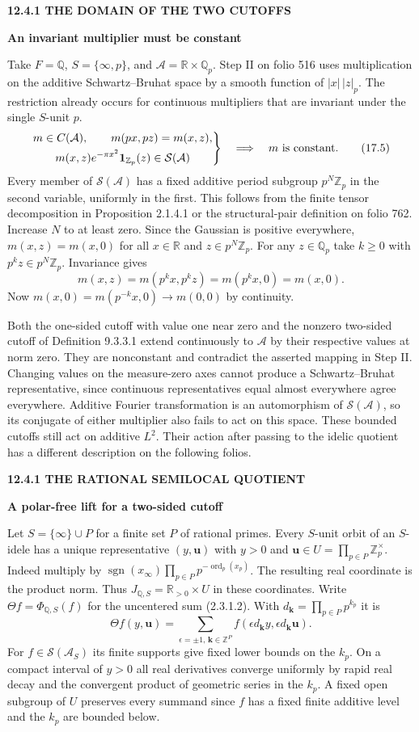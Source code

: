\documentclass[11pt,letterpaper]{article}
\newcommand{\rightmarktext}{}
\newcommand{\printfolio}{}
\newcommand{\leaf}[4]{\clearpage\gdef\printfolio{#1}\gdef\rightmarktext{#2}%
  {\small\sffamily\bfseries\color{ink}#3\par}\vspace{3pt}%
  {\LARGE\bfseries #4\par}\vspace{5pt}}
\newcommand{\R}{\mathbb R}
\newcommand{\Q}{\mathbb Q}
\newcommand{\Z}{\mathbb Z}
\begin{document}
\leaf{518b}{The mixed additive space}{12.4.1 \quad THE DOMAIN OF THE TWO CUTOFFS}{An invariant multiplier must be constant}
Take $F=\Q$, $S=\{\infty,p\}$, and $\mathcal A=\R\times\Q_p$.
Step II on folio 516 uses multiplication on the additive
Schwartz--Bruhat space by a smooth function of $|x|\,|z|_p$.
The restriction already occurs for continuous multipliers that are
invariant under the single $S$-unit $p$.
\[
 \left.
 \begin{gathered}
 m\in C(\mathcal A),\qquad m(px,pz)=m(x,z),\\
 m(x,z)e^{-\pi x^2}\mathbf1_{\Z_p}(z)\in\mathcal S(\mathcal A)
 \end{gathered}\right\}
 \quad\Longrightarrow\quad m\ \hbox{is constant}.
 \tag{17.5}
\]
Every member of $\mathcal S(\mathcal A)$ has a fixed additive period
subgroup $p^N\Z_p$ in the second variable, uniformly in the first.
This follows from the finite tensor decomposition in Proposition 2.1.4.1
or the structural-pair definition on folio 762. Increase $N$ to at
least zero. Since the Gaussian is positive everywhere,
$m(x,z)=m(x,0)$ for all $x\in\R$ and $z\in p^N\Z_p$.
For any $z\in\Q_p$ take $k\ge0$ with $p^kz\in p^N\Z_p$. Invariance gives
\[
       m(x,z)=m(p^kx,p^kz)=m(p^kx,0)=m(x,0).
\]
Now $m(x,0)=m(p^{-k}x,0)\to m(0,0)$ by continuity.

Both the one-sided cutoff with value one near zero and the nonzero
two-sided cutoff of Definition 9.3.3.1 extend continuously to
$\mathcal A$ by their respective values at norm zero. They are
nonconstant and contradict the asserted mapping in Step II. Changing
values on the measure-zero axes cannot produce a Schwartz--Bruhat
representative, since continuous representatives equal almost everywhere
agree everywhere. Additive Fourier transformation is an automorphism
of $\mathcal S(\mathcal A)$, so its conjugate of either multiplier also
fails to act on this space. These bounded cutoffs still act on additive
$L^2$. Their action after passing to the idelic quotient has a different
description on the following folios.

\leaf{518c}{A quotient lift}{12.4.1 \quad THE RATIONAL SEMILOCAL QUOTIENT}{A polar-free lift for a two-sided cutoff}
Let $S=\{\infty\}\cup P$ for a finite set $P$ of rational primes.
Every $S$-unit orbit of an $S$-idele has a unique representative
$(y,\mathbf u)$ with $y>0$ and $\mathbf u\in U=\prod_{p\in P}\Z_p^\times$.
Indeed multiply by $\operatorname{sgn}(x_\infty)\prod_{p\in P}
p^{-\operatorname{ord}_p(x_p)}$. The resulting real coordinate is the
product norm. Thus $J_{\Q,S}=\R_{>0}\times U$ in these coordinates.
Write $\Theta f=\Phi_{\Q,S}(f)$ for the uncentered sum (2.3.1.2). With
$d_{\mathbf k}=\prod_{p\in P}p^{k_p}$ it is
\[
 \Theta f(y,\mathbf u)=\sum_{\epsilon=\pm1,\,\mathbf k\in\Z^P}
                  f(\epsilon d_{\mathbf k}y,\epsilon d_{\mathbf k}\mathbf u).
\]
For $f\in\mathcal S(\mathcal A_S)$ its finite supports give fixed
lower bounds on the $k_p$. On a compact interval of $y>0$ all real
derivatives converge uniformly by rapid real decay and the convergent
product of geometric series in the $k_p$. A fixed open subgroup of
$U$ preserves every summand since $f$ has a fixed finite additive
level and the $k_p$ are bounded below.
\end{document}
